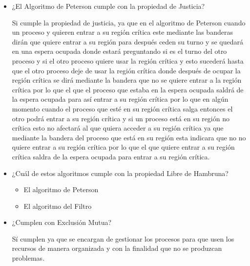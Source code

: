 \documentclass[answers]{exam}
\begin{document}
\begin{enumerate}
\begin{itemize}
        \item ¿El Algoritmo de Peterson cumple con la propiedad de Justicia?
        \begin{solution}
           Si cumple la propiedad de justicia, ya que en el algoritmo de Peterson cuando un proceso  y quieren entrar  a su región crítica este mediante las banderas dirán que quiere entrar a su región  para después ceden su  turno y se quedará  en una espera ocupada donde estará preguntando si es el turno del otro proceso y si el otro proceso quiere usar la región crítica  y esto sucederá  hasta que el otro proceso deje de usar la región crítica donde después de ocupar la región crítica se dirá mediante la bandera que no se quiere entrar a la región crítica por lo que el que el proceso que estaba en la espera ocupada  saldrá de la espera ocupada para así entrar a su región crítica por lo que  en algún momento cuando el proceso que esté en su región crítica salga  entonces el otro podrá entrar a su región crítica y si un proceso está en su región no crítica esto no afectará al que quiera acceder a su región crítica ya que mediante la  bandera del proceso que está en su región esta indicara que no no quiere entrar a su región crítica por lo que el que quiere entrar a su región crítica saldra de la espera ocupada para entrar a su región crítica.
        \end{solution}

        \item ¿Cuál de estos algoritmos cumple con la propiedad Libre de Hambruna?
        \begin{solution}
           \begin{itemize}
               \item  El algoritmo de Peterson
               \item El algoritmo del Filtro
           \end{itemize}
        \end{solution}

        \item ¿Cumplen con Exclusión Mutua?
        \begin{solution}
            Sí cumplen ya que se encargan de gestionar los procesos para que usen los recursos de manera organizada y con la finalidad que no se produzcan problemas.
        \end{solution}

    \end{itemize}
\end{enumerate}
\end{document}
